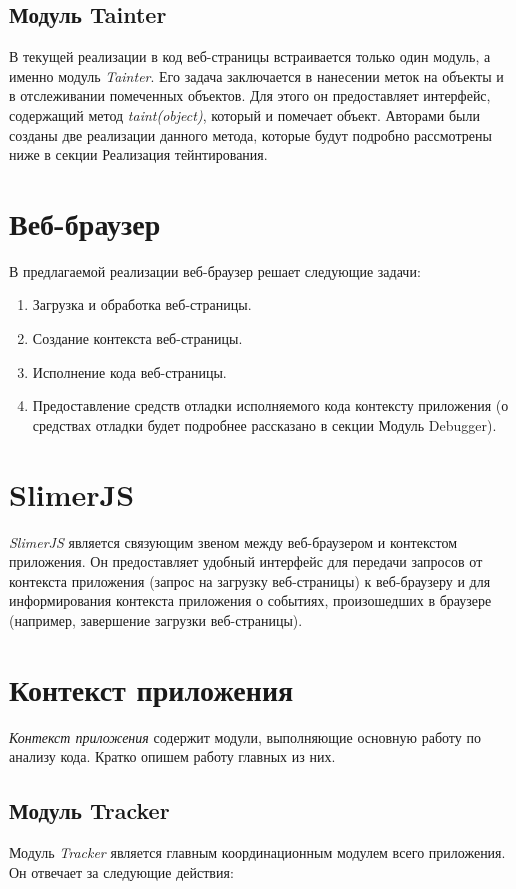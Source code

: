 \subsection{Модуль Tainter}
	В текущей реализации в код веб-страницы встраивается только один модуль, а именно модуль \textit{Tainter}. Его задача заключается в нанесении меток на объекты и в отслеживании помеченных объектов. Для этого он предоставляет интерфейс, содержащий метод \textit{taint(object)}, который и помечает объект. Авторами были созданы две реализации данного метода, которые будут подробно рассмотрены ниже в секции Реализация тейнтирования.

\section{Веб-браузер}
В предлагаемой реализации веб-браузер решает следующие задачи:

\bigskip
\begin{enumerate}
	\item Загрузка и обработка веб-страницы.
	\item Создание контекста веб-страницы.
	\item Исполнение кода веб-страницы.
	\item Предоставление средств отладки исполняемого кода контексту приложения (о средствах отладки будет подробнее рассказано в секции Модуль Debugger).
\end{enumerate}

\section{SlimerJS}
\textit{SlimerJS} является связующим звеном между веб-браузером и контекстом приложения. Он предоставляет удобный интерфейс для передачи запросов от контекста приложения (запрос на загрузку веб-страницы) к веб-браузеру и для информирования контекста приложения о событиях, произошедших в браузере (например, завершение загрузки веб-страницы).

\section{Контекст приложения}

\textit{Контекст приложения} содержит модули, выполняющие основную работу по анализу кода. Кратко опишем работу главных из них.

\subsection{Модуль Tracker}
	Модуль \textit{Tracker} является главным координационным модулем всего приложения. Он отвечает за следующие действия:

